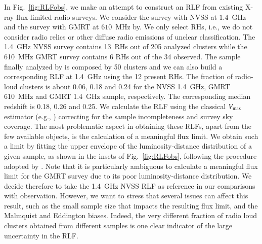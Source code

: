 \documentclass[useAMS,usenatbib]{mn2e}
\begin{document}
\begin{appendix}
In Fig.~\ref{fig:RLFobs}, we make an attempt to construct an RLF from existing
X-ray flux-limited radio surveys. We consider the
\cite{1999NewA....4..141G} survey with NVSS at $1.4$~GHz and the
\cite{VenturiGMRT_1,VenturiGMRT_2} survey with GMRT at $610$~MHz by. We only
select RHs, i.e., we do not consider radio relics or other diffuse radio
emissions of unclear classification. The 1.4~GHz NVSS survey contains 13~RHs out
of 205 analyzed clusters while the 610~MHz GMRT survey contains 6 RHs out of the
34 observed. The sample finally analyzed by \cite{VenturiGMRT_1,VenturiGMRT_2}
is composed by 50 clusters and we can also build a corresponding RLF at 1.4~GHz
using the 12 present RHs. The fraction of radio-loud clusters is about 0.06, 0.18
and 0.24 for the NVSS 1.4~GHz, GMRT 610~MHz and GMRT 1.4~GHz sample,
respectively. The corresponding median redshift is 0.18, 0.26 and 0.25. We
calculate the RLF using the classical $V_{{\mathrm{max}}}$ estimator (e.g.,
\citealp{1976ApJ...207..700F}) correcting for the sample incompleteness and
survey sky coverage. The most problematic aspect in obtaining these RLFs, apart
from the few available objects, is the calculation of a meaningful flux
limit. We obtain such a limit by fitting the upper envelope of the
luminosity-distance distribution of a given sample, as shown in the insets of
Fig.~\ref{fig:RLFobs}, following the procedure adopted by
\cite{2011arXiv1106.5494B}. Note that it is particularly ambiguous to calculate
a meaningful flux limit for the GMRT survey due to its poor luminosity-distance
distribution. We decide therefore to take the 1.4~GHz NVSS RLF as reference in
our comparisons with observation. However, we want to stress that several issues
can affect this result, such as the small sample size that impacts the resulting
flux limit, and the Malmquist and Eddington biases. Indeed, the very different
fraction of radio loud clusters obtained from different samples is one clear
indicator of the large uncertainty in the RLF. 




\end{appendix}
\end{document}
